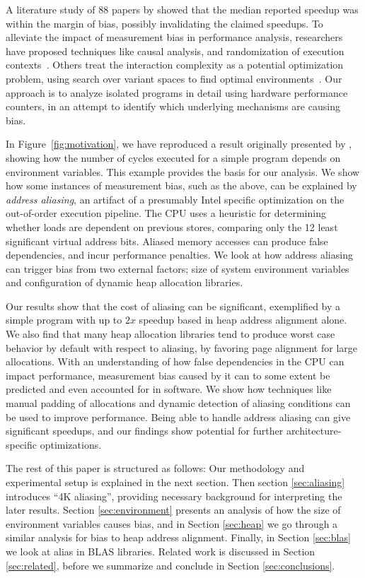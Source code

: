 \documentclass{acm_proc_article-sp}
\begin{document}
A literature study of 88 papers by  showed that the median reported speedup was within the margin of bias, possibly invalidating the claimed speedups. 
To alleviate the impact of measurement bias in performance analysis, researchers have proposed techniques like causal analysis, and randomization of execution contexts~\cite{Mytkowicz:2008:OE&MB}.
Others treat the interaction complexity as a potential optimization problem, using search over variant spaces to find optimal environments~\cite{Knights:2009:BlindOpt}.
Our approach is to analyze isolated programs in detail using hardware performance counters, in an attempt to identify which underlying mechanisms are causing bias.

In Figure~\ref{fig:motivation}, we have reproduced a result originally presented by , showing how the number of cycles executed for a simple program depends on environment variables.
This example provides the basis for our analysis.
We show how some instances of measurement bias, such as the above, can be explained by \emph{address aliasing}, an artifact of a presumably Intel specific optimization on the out-of-order execution pipeline.
The CPU uses a heuristic for determining whether loads are dependent on previous stores, comparing only the 12 least significant virtual address bits.
Aliased memory accesses can produce false dependencies, and incur performance penalties.
We look at how address aliasing can trigger bias from two external factors; size of system environment variables and configuration of dynamic heap allocation libraries.

Our results show that the cost of aliasing can be significant, exemplified by a simple program with up to $2x$ speedup based in heap address alignment alone.
We also find that many heap allocation libraries tend to produce worst case behavior by default with respect to aliasing, by favoring page alignment for large allocations.
With an understanding of how false dependencies in the CPU can impact performance, measurement bias caused by it can to some extent be predicted and even accounted for in software.
We show how techniques like manual padding of allocations and dynamic detection of aliasing conditions can be used to improve performance. 
Being able to handle address aliasing can give significant speedups, and our findings show potential for further architecture-specific optimizations.

The rest of this paper is structured as follows: Our methodology and experimental setup is explained in the next section.
Then section \ref{sec:aliasing} introduces ``4K aliasing'', providing necessary background for interpreting the later results.
Section \ref{sec:environment} presents an analysis of how the size of environment variables causes bias, and in Section \ref{sec:heap} we go through a similar analysis for bias to heap address alignment.
Finally, in Section \ref{sec:blas} we look at alias in BLAS libraries.
Related work is discussed in Section \ref{sec:related}, before we summarize and conclude in Section \ref{sec:conclusions}.
\end{document}
